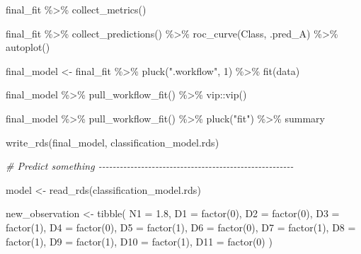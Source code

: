 \documentclass[
]{book}
\newenvironment{Shaded}{\begin{snugshade}}{\end{snugshade}}
\newcommand{\AttributeTok}[1]{\textcolor[rgb]{0.77,0.63,0.00}{#1}}
\newcommand{\CommentTok}[1]{\textcolor[rgb]{0.56,0.35,0.01}{\textit{#1}}}
\newcommand{\DecValTok}[1]{\textcolor[rgb]{0.00,0.00,0.81}{#1}}
\newcommand{\FloatTok}[1]{\textcolor[rgb]{0.00,0.00,0.81}{#1}}
\newcommand{\FunctionTok}[1]{\textcolor[rgb]{0.00,0.00,0.00}{#1}}
\newcommand{\NormalTok}[1]{#1}
\newcommand{\OtherTok}[1]{\textcolor[rgb]{0.56,0.35,0.01}{#1}}
\newcommand{\SpecialCharTok}[1]{\textcolor[rgb]{0.00,0.00,0.00}{#1}}
\newcommand{\StringTok}[1]{\textcolor[rgb]{0.31,0.60,0.02}{#1}}
\begin{document}
\begin{Shaded}
\begin{Highlighting}[]
\NormalTok{final\_fit }\SpecialCharTok{\%\textgreater{}\%} \FunctionTok{collect\_metrics}\NormalTok{()}

\NormalTok{final\_fit }\SpecialCharTok{\%\textgreater{}\%}
  \FunctionTok{collect\_predictions}\NormalTok{() }\SpecialCharTok{\%\textgreater{}\%}
  \FunctionTok{roc\_curve}\NormalTok{(Class, .pred\_A) }\SpecialCharTok{\%\textgreater{}\%}
  \FunctionTok{autoplot}\NormalTok{()}

\NormalTok{final\_model }\OtherTok{\textless{}{-}}\NormalTok{ final\_fit }\SpecialCharTok{\%\textgreater{}\%}
  \FunctionTok{pluck}\NormalTok{(}\StringTok{".workflow"}\NormalTok{, }\DecValTok{1}\NormalTok{) }\SpecialCharTok{\%\textgreater{}\%}
  \FunctionTok{fit}\NormalTok{(data)}

\NormalTok{final\_model }\SpecialCharTok{\%\textgreater{}\%}
  \FunctionTok{pull\_workflow\_fit}\NormalTok{() }\SpecialCharTok{\%\textgreater{}\%} 
\NormalTok{  vip}\SpecialCharTok{::}\FunctionTok{vip}\NormalTok{()}

\NormalTok{final\_model }\SpecialCharTok{\%\textgreater{}\%}
  \FunctionTok{pull\_workflow\_fit}\NormalTok{() }\SpecialCharTok{\%\textgreater{}\%}
  \FunctionTok{pluck}\NormalTok{(}\StringTok{"fit"}\NormalTok{) }\SpecialCharTok{\%\textgreater{}\%}
\NormalTok{  summary}

\FunctionTok{write\_rds}\NormalTok{(final\_model, }\StringTok{\textquotesingle{}classification\_model.rds\textquotesingle{}}\NormalTok{)}


\CommentTok{\# Predict something {-}{-}{-}{-}{-}{-}{-}{-}{-}{-}{-}{-}{-}{-}{-}{-}{-}{-}{-}{-}{-}{-}{-}{-}{-}{-}{-}{-}{-}{-}{-}{-}{-}{-}{-}{-}{-}{-}{-}{-}{-}{-}{-}{-}{-}{-}{-}{-}{-}{-}{-}{-}{-}{-}{-}}

\NormalTok{model }\OtherTok{\textless{}{-}} \FunctionTok{read\_rds}\NormalTok{(}\StringTok{\textquotesingle{}classification\_model.rds\textquotesingle{}}\NormalTok{)}

\NormalTok{new\_observation }\OtherTok{\textless{}{-}} \FunctionTok{tibble}\NormalTok{(}
  \AttributeTok{N1 =} \FloatTok{1.8}\NormalTok{,}
  \AttributeTok{D1 =} \FunctionTok{factor}\NormalTok{(}\DecValTok{0}\NormalTok{),}
  \AttributeTok{D2 =} \FunctionTok{factor}\NormalTok{(}\DecValTok{0}\NormalTok{),}
  \AttributeTok{D3 =} \FunctionTok{factor}\NormalTok{(}\DecValTok{1}\NormalTok{),}
  \AttributeTok{D4 =} \FunctionTok{factor}\NormalTok{(}\DecValTok{0}\NormalTok{),}
  \AttributeTok{D5 =} \FunctionTok{factor}\NormalTok{(}\DecValTok{1}\NormalTok{),}
  \AttributeTok{D6 =} \FunctionTok{factor}\NormalTok{(}\DecValTok{0}\NormalTok{),}
  \AttributeTok{D7 =} \FunctionTok{factor}\NormalTok{(}\DecValTok{1}\NormalTok{),}
  \AttributeTok{D8 =} \FunctionTok{factor}\NormalTok{(}\DecValTok{1}\NormalTok{),}
  \AttributeTok{D9 =} \FunctionTok{factor}\NormalTok{(}\DecValTok{1}\NormalTok{),}
  \AttributeTok{D10 =} \FunctionTok{factor}\NormalTok{(}\DecValTok{1}\NormalTok{),}
  \AttributeTok{D11 =} \FunctionTok{factor}\NormalTok{(}\DecValTok{0}\NormalTok{)}
\NormalTok{)}


\end{Highlighting}
\end{Shaded}
\end{document}
